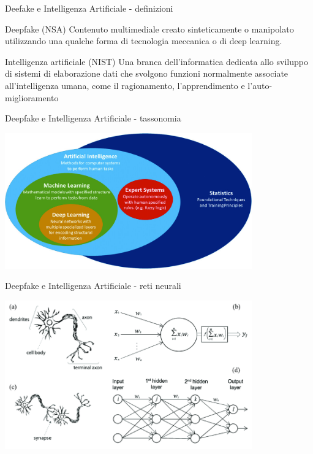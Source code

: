 \documentclass[11pt]{beamer}
\begin{document}
\begin{frame}{Deefake e Intelligenza Artificiale - definizioni}

\begin{alertblock}{Deepfake (NSA) \cite{nsa_definition}}
Contenuto multimediale creato sinteticamente o manipolato utilizzando una qualche forma di tecnologia meccanica o di deep learning.
\end{alertblock}

\begin{alertblock}{Intelligenza artificiale (NIST) \cite{nist_definitioN_AI}}
Una branca dell'informatica dedicata allo sviluppo di sistemi di elaborazione dati che svolgono funzioni normalmente associate all'intelligenza umana, come il ragionamento, l'apprendimento e l'auto-miglioramento
\end{alertblock}

\end{frame}

\begin{frame}{Deepfake e Intelligenza Artificiale - tassonomia \cite{tassonomia}}

\begin{center}
\includegraphics[width=0.8\textwidth]{Pic/IA_classification.jpg}
\end{center}

\end{frame}

\begin{frame}{Deepfake e Intelligenza Artificiale - reti neurali \cite{NN}}

\begin{center}
\includegraphics[width=0.8\textwidth]{Pic/Neural_network.png}
\end{center}

\end{frame}
\end{document}
